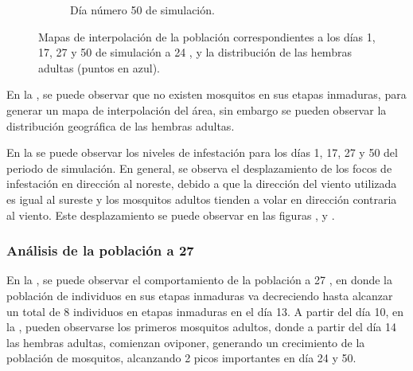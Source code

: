 \begin{figure}[!htbp]
\begin{subfigure}[b]{0.45\textwidth}
            \caption{\label{fig:niveles-infestacion-24-d}Día número 50 de simulación.}
    \end{subfigure}

    \caption{\label{fig:niveles-infestacion-24} Mapas de interpolación de la población correspondientes a los días 1, 17, 27 y 50 de simulación a 24 \textcelsius, y la distribución de las hembras adultas (puntos en azul). }
\end{figure}

En la , se puede observar que no existen mosquitos en sus
etapas inmaduras, para generar un mapa de interpolación del área, sin embargo se pueden observar la
distribución geográfica de las hembras adultas.

En la  se puede observar los niveles de infestación para los
días 1, 17, 27 y 50 del periodo de simulación. En general, se observa el desplazamiento de los
focos de infestación en dirección al noreste, debido a que la dirección del viento utilizada es
igual al sureste y los mosquitos adultos tienden a volar en dirección contraria al viento. Este
desplazamiento se puede observar en las figuras
 ,  y
.

\subsubsection{Análisis de la población a 27\textcelsius}
En la , se puede observar el comportamiento de la población a
27 \textcelsius, en donde la población de individuos en sus etapas inmaduras va decreciendo hasta
alcanzar un total de 8 individuos en etapas inmaduras en el día 13. A partir del día 10, en la
, pueden observarse los primeros mosquitos adultos, donde a
partir del día 14 las hembras adultas, comienzan oviponer, generando un crecimiento de la
población de mosquitos, alcanzando 2 picos importantes en día 24 y 50.

